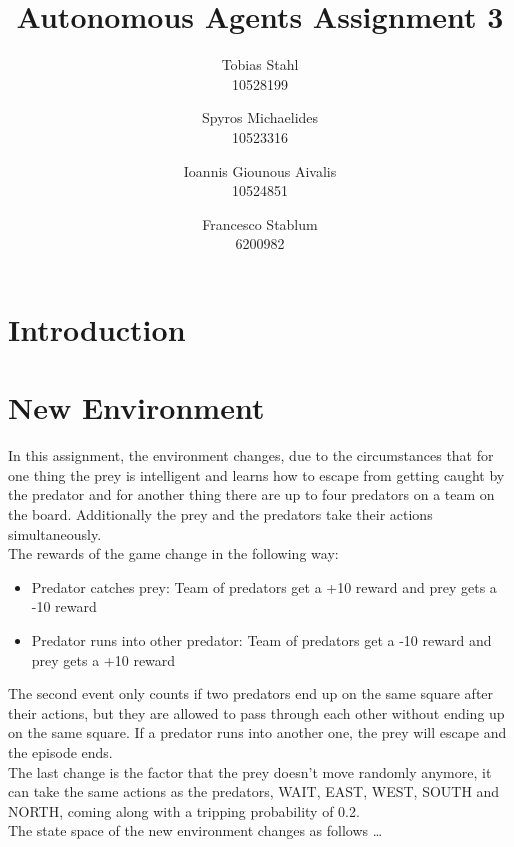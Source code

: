 \documentclass[a4paper,10pt]{article}
\title{
	\textbf{Autonomous Agents Assignment 3}
}
\author{Tobias Stahl \\ 10528199 \and Spyros Michaelides \\ 10523316 \and Ioannis Giounous Aivalis \\ 10524851 \and Francesco Stablum \\ 6200982}
\begin{document}
\maketitle


\section{Introduction}







\section{New Environment}
In this assignment, the environment changes, due to the circumstances that for one thing the prey is intelligent and learns how to escape from getting caught by the predator and for another thing there are up to four predators on a team on the board. Additionally the prey and the predators take their actions simultaneously.\\
The rewards of the game change in the following way:
\begin{itemize}
	\item Predator catches prey: Team of predators get a +10 reward and prey gets a -10 reward
	\item Predator runs into other predator: Team of predators get a -10 reward and prey gets a +10 reward
\end{itemize}
The second event only counts if two predators end up on the same square after their actions, but they are allowed to pass through each other without ending up on the same square. If a predator runs into another one, the prey will escape and the episode ends.\\
The last change is the factor that the prey doesn't move randomly anymore, it can take the same actions as the predators, WAIT, EAST, WEST, SOUTH and NORTH, coming along with a tripping probability of 0.2.\\
The state space of the new environment changes as follows \dots
\end{document}
